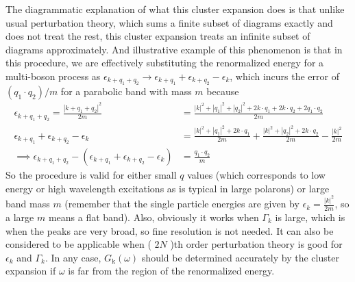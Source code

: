 \begin{tcolorbox}
    The diagrammatic explanation of what this cluster expansion does is that unlike usual perturbation theory, which sums a finite subset of diagrams exactly and does not treat the rest, this cluster expansion treats an infinite subset of diagrams approximately. And illustrative example of this phenomenon is that in this procedure, we are effectively substituting the renormalized energy for a multi-boson process as $\epsilon_{k+q_1+q_2} \rightarrow \epsilon_{k+q_1} + \epsilon_{k+q_2} - \epsilon_k$, which incurs the error of $(q_1 \cdot q_2)/m$ for a parabolic band with mass $m$ because
\begin{align}
    \epsilon_{k+q_1+q_2} = \frac{|k+q_1+q_2|^2}{2 m} &= \frac{|k|^2 + |q_1|^2 + |q_2|^2 + 2 k \cdot q_1 + 2 k \cdot q_2 + 2 q_1 \cdot q_2}{2 m} \\
\epsilon_{k+q_1} + \epsilon_{k+q_2} - \epsilon_k &= \frac{|k|^2 + |q_1|^2 + 2 k \cdot q_1}{2 m} + \frac{|k|^2 + |q_2|^2 + 2 k \cdot q_2}{2 m} - \frac{|k|^2}{2 m} \\
\implies \epsilon_{k+q_1+q_2} - \left( \epsilon_{k+q_1} + \epsilon_{k+q_2} - \epsilon_k \right) &= \frac{q_1 \cdot q_2}{m}
\end{align}
So the procedure is valid for either small $q$ values (which corresponds to low energy or high wavelength excitations as is typical in large polarons) or large band mass $m$ (remember that the single particle energies are given by $\epsilon_k = \frac{|k|^2}{2 m}$, so a large $m$ means a flat band). Also, obviously it works when $\Gamma_k$ is large, which is when the peaks are very broad, so fine resolution is not needed. It can also be considered to be applicable when ( $2 N$ )th order perturbation theory is good for $\epsilon _k$ and $\Gamma_k$. In any case, $G_{\mathrm{k}}(\omega)$ should be determined accurately by the cluster expansion if $\omega$ is far from the region of the renormalized energy.
\end{tcolorbox}
